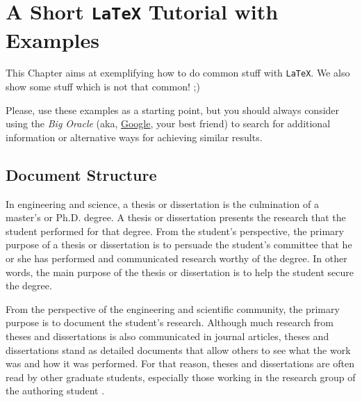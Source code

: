 \chapter{A Short \texttt{LaTeX} Tutorial with Examples}
\label{cha:a_short_latex_tutorial_with_examples}

This Chapter aims at exemplifying how to do common stuff with \texttt{LaTeX}. We also show some stuff which is not that common! ;) 

Please, use these examples as a starting point, but you should always consider using the \emph{Big Oracle} (aka, \href{http://www.google.com}{Google}, your best friend) to search for additional information or alternative ways for achieving similar results.


\section{Document Structure} %
\label{sec:document_structure}

In engineering and science, a thesis or dissertation is the culmination of a master's or Ph.D. degree. A thesis or dissertation presents the research that the student performed for that degree. From the student's perspective, the primary purpose of a thesis or dissertation is to persuade the student's committee that he or she has performed and communicated research worthy of the degree. In other words, the main purpose of the thesis or dissertation is to help the student secure the degree. 

From the perspective of the engineering and scientific community, the primary purpose is to document the student's research. Although much research from theses and dissertations is also communicated in journal articles, theses and dissertations stand as detailed documents that allow others to see what the work was and how it was performed. For that reason, theses and dissertations are often read by other graduate students, especially those working in the research group of the authoring student \cite{gustavii2016write, glasman2010science, chicago, strunk}. 
	
